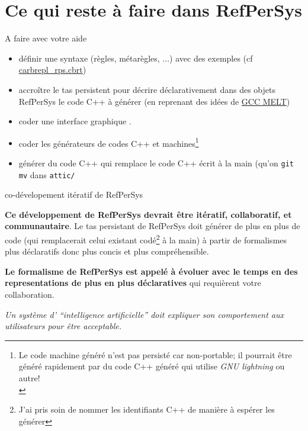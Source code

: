 \documentclass[final,a4,xcolor={svgnames,dvipsnames}]{beamer}
\begin{document}
 \section{Ce qui reste à faire dans RefPerSys}
 \label{sec:refpersys-a-faire}
 \begin{frame}{A faire avec votre aide}
   \begin{itemize}
   \item définir une syntaxe (règles, métarègles, ...) avec des exemples (cf \href{https://github.com/RefPerSys/RefPerSys/blob/master/carbrepl_rps.cbrt}{carbrepl\_rps.cbrt})
   \item accroître le tas persistent pour décrire déclarativement dans
     des objets RefPerSys le code C++ à générer (en reprenant des idées de \href{https://arxiv.org/abs/1109.0779}{GCC MELT})
     \item coder une interface graphique {}.
   \item coder les générateurs de codes C++ et machines\footnote{Le
   code machine généré n'est pas persisté car non-portable; il
   pourrait être généré rapidement par du code C++ généré qui utilise \textit{GNU lightning} ou autre!\medskip\\}
     \item générer du code C++ qui remplace le code C++ écrit à la
       main (qu'on \texttt{git mv} dans \texttt{attic/}
   \end{itemize}

 \end{frame}

 \begin{frame}{co-dévelopement itératif de RefPerSys}
   
   \textbf{Ce développement de RefPerSys devrait être itératif,
     collaboratif, et communautaire}. Le tas persistant de RefPerSys
   doit générer de plus en plus de code (qui remplacerait celui
   existant codé\footnote{J'ai pris soin de nommer les identifiants
   C++ de manière à espérer les générer} à la main) à partir de
   formalismes plus déclaratifs donc plus concis et plus
   compréhensible.

   \bigskip
   
   \textbf{Le formalisme de RefPerSys est appelé à évoluer avec le
     temps en des representations de plus en plus déclaratives} qui
   requièrent votre collaboration.

   \bigskip
   
   \textit{Un système d' ``intelligence artificielle'' doit expliquer
     son comportement aux utilisateurs pour être acceptable.}
 \end{frame}
\end{document}
